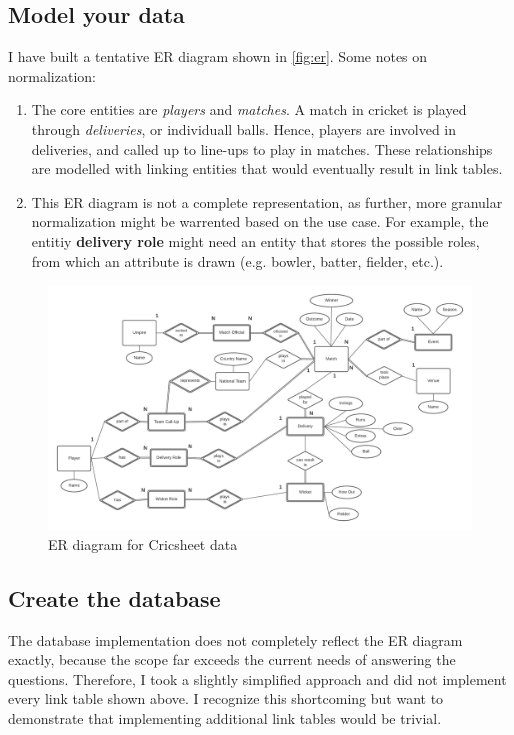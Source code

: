\subsection{Model your data}

I have built a tentative ER diagram shown in \autoref{fig:er}. Some notes on normalization:

\begin{enumerate}
    \item The core entities are \textit{players} and \textit{matches}. A match in cricket is played through \textit{deliveries}, or individuall balls. Hence, players are involved in deliveries, and called up to line-ups to play in matches. These relationships are modelled with linking entities that would eventually result in link tables.
    \item This ER diagram is not a complete representation, as further, more granular normalization might be warrented based on the use case. For example, the entitiy \textbf{delivery role} might need an entity that stores the possible roles, from which an attribute is drawn (e.g. bowler, batter, fielder, etc.).
\end{enumerate}

\begin{figure}[H]
    \centering
    \includegraphics[width=\textwidth]{Cricsheet.png}
    \caption{ER diagram for Cricsheet data}
    \label{fig:er}
\end{figure}

\subsection{Create the database}

The database implementation does not completely reflect the ER diagram exactly, because the scope far exceeds the current needs of answering the questions. Therefore, I took a slightly simplified approach and did not implement every link table shown above. I recognize this shortcoming but want to demonstrate that implementing additional link tables would be trivial.

